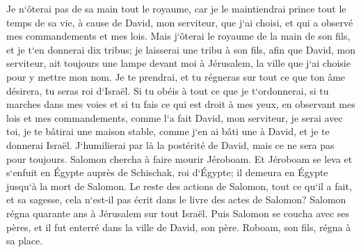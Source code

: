 \verse Je n`ôterai pas de sa main tout le royaume, car je le maintiendrai prince tout le temps de sa vie, à cause de David, mon serviteur, que j`ai choisi, et qui a observé mes commandements et mes lois. 
\verse Mais j`ôterai le royaume de la main de son fils, et je t`en donnerai dix tribus; 
\verse je laisserai une tribu à son fils, afin que David, mon serviteur, ait toujours une lampe devant moi à Jérusalem, la ville que j`ai choisie pour y mettre mon nom. 
\verse Je te prendrai, et tu régneras sur tout ce que ton âme désirera, tu seras roi d`Israël. 
\verse Si tu obéis à tout ce que je t`ordonnerai, si tu marches dans mes voies et si tu fais ce qui est droit à mes yeux, en observant mes lois et mes commandements, comme l`a fait David, mon serviteur, je serai avec toi, je te bâtirai une maison stable, comme j`en ai bâti une à David, et je te donnerai Israël. 
\verse J`humilierai par là la postérité de David, mais ce ne sera pas pour toujours. 
\verse Salomon chercha à faire mourir Jéroboam. Et Jéroboam se leva et s`enfuit en Égypte auprès de Schischak, roi d`Égypte; il demeura en Égypte jusqu`à la mort de Salomon. 
\verse Le reste des actions de Salomon, tout ce qu`il a fait, et sa sagesse, cela n`est-il pas écrit dans le livre des actes de Salomon? 
\verse Salomon régna quarante ans à Jérusalem sur tout Israël. 
\verse Puis Salomon se coucha avec ses pères, et il fut enterré dans la ville de David, son père. Roboam, son fils, régna à sa place. 

